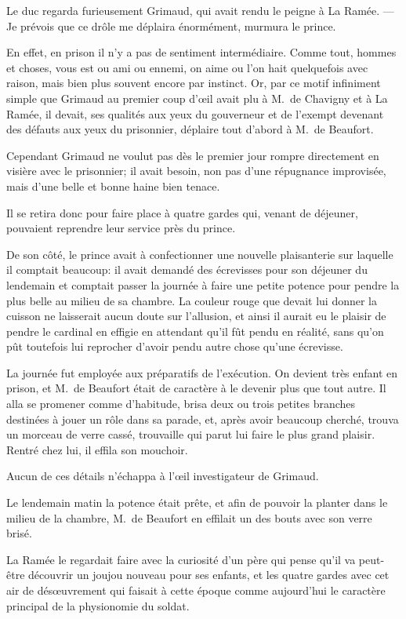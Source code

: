 Le duc regarda furieusement Grimaud, qui avait rendu le peigne à La Ramée.
— Je prévois que ce drôle me déplaira énormément, murmura le prince.

En effet, en prison il n'y a pas de sentiment intermédiaire. Comme tout, hommes et choses, vous est ou ami ou ennemi, on aime ou l'on hait quelquefois avec raison, mais bien plus souvent encore par instinct. Or, par ce motif infiniment simple que Grimaud au premier coup d'œil avait plu à M.~de Chavigny et à La Ramée, il devait, ses qualités aux yeux du gouverneur et de l'exempt devenant des défauts aux yeux du prisonnier, déplaire tout d'abord à M.~de Beaufort.

Cependant Grimaud ne voulut pas dès le premier jour rompre directement en visière avec le prisonnier; il avait besoin, non pas d'une répugnance improvisée, mais d'une belle et bonne haine bien tenace.

Il se retira donc pour faire place à quatre gardes qui, venant de déjeuner, pouvaient reprendre leur service près du prince.

De son côté, le prince avait à confectionner une nouvelle plaisanterie sur laquelle il comptait beaucoup: il avait demandé des écrevisses pour son déjeuner du lendemain et comptait passer la journée à faire une petite potence pour pendre la plus belle au milieu de sa chambre. La couleur rouge que devait lui donner la cuisson ne laisserait aucun doute sur l'allusion, et ainsi il aurait eu le plaisir de pendre le cardinal en effigie en attendant qu'il fût pendu en réalité, sans qu'on pût toutefois lui reprocher d'avoir pendu autre chose qu'une écrevisse.

La journée fut employée aux préparatifs de l'exécution. On devient très enfant en prison, et M.~de Beaufort était de caractère à le devenir plus que tout autre. Il alla se promener comme d'habitude, brisa deux ou trois petites branches destinées à jouer un rôle dans sa parade, et, après avoir beaucoup cherché, trouva un morceau de verre cassé, trouvaille qui parut lui faire le plus grand plaisir. Rentré chez lui, il effila son mouchoir.

Aucun de ces détails n'échappa à l'œil investigateur de Grimaud.

Le lendemain matin la potence était prête, et afin de pouvoir la planter dans le milieu de la chambre, M.~de Beaufort en effilait un des bouts avec son verre brisé.

La Ramée le regardait faire avec la curiosité d'un père qui pense qu'il va peut-être découvrir un joujou nouveau pour ses enfants, et les quatre gardes avec cet air de désœuvrement qui faisait à cette époque comme aujourd'hui le caractère principal de la physionomie du soldat.

